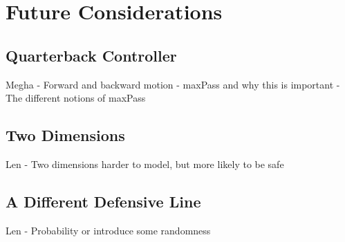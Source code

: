 \newpage


\section{Future Considerations}

\subsection{Quarterback Controller}

Megha 
- Forward and backward motion 
- maxPass and why this is important
- The different notions of maxPass

\subsection{Two Dimensions}

Len
- Two dimensions harder to model, but more likely to be safe 

\subsection{A Different Defensive Line}

Len
- Probability or introduce some randomness
